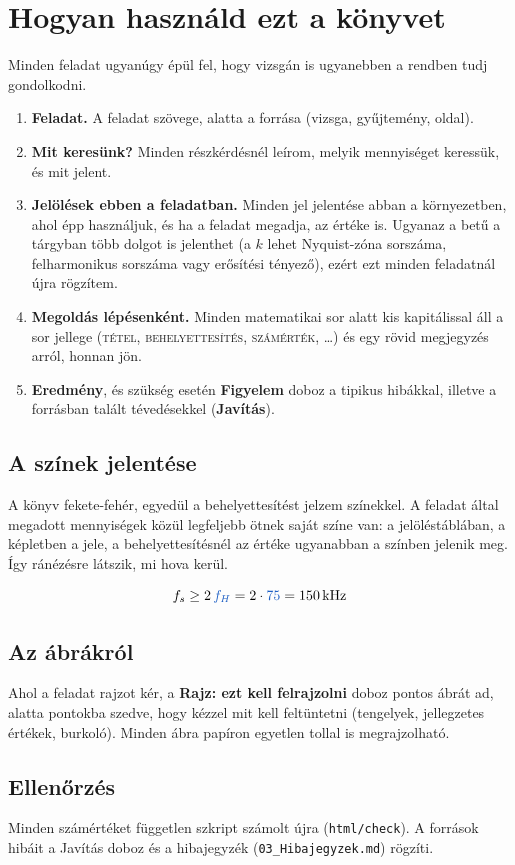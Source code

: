 \chapter*{Hogyan használd ezt a könyvet}
Minden feladat ugyanúgy épül fel, hogy vizsgán is ugyanebben a rendben tudj gondolkodni.
\begin{enumerate}
\item \textbf{Feladat.} A feladat szövege, alatta a forrása (vizsga, gyűjtemény, oldal).
\item \textbf{Mit keresünk?} Minden részkérdésnél leírom, melyik mennyiséget keressük, és mit jelent.
\item \textbf{Jelölések ebben a feladatban.} Minden jel jelentése abban a környezetben, ahol épp használjuk, és ha a feladat megadja, az értéke is. Ugyanaz a betű a tárgyban több dolgot is jelenthet (a $k$ lehet Nyquist-zóna sorszáma, felharmonikus sorszáma vagy erősítési tényező), ezért ezt minden feladatnál újra rögzítem.
\item \textbf{Megoldás lépésenként.} Minden matematikai sor alatt kis kapitálissal áll a sor jellege (\textsc{tétel}, \textsc{behelyettesítés}, \textsc{számérték}, \ldots) és egy rövid megjegyzés arról, honnan jön.
\item \textbf{Eredmény}, és szükség esetén \textbf{Figyelem} doboz a tipikus hibákkal, illetve a forrásban talált tévedésekkel (\textbf{Javítás}).
\end{enumerate}

\section*{A színek jelentése}
A könyv fekete-fehér, egyedül a behelyettesítést jelzem színekkel. A feladat által megadott mennyiségek közül legfeljebb ötnek saját színe van: a jelöléstáblában, a képletben a jele, a behelyettesítésnél az értéke ugyanabban a színben jelenik meg. Így ránézésre látszik, mi hova kerül.
\begin{center}
\quad {}\quad {}\quad {}\quad {}
\end{center}
\[
f_s\ge2\,\ca{f_H}=2\cdot\ca{75}=150\un{kHz}
\]

\section*{Az ábrákról}
Ahol a feladat rajzot kér, a \textbf{Rajz: ezt kell felrajzolni} doboz pontos ábrát ad, alatta pontokba szedve, hogy kézzel mit kell feltüntetni (tengelyek, jellegzetes értékek, burkoló). Minden ábra papíron egyetlen tollal is megrajzolható.

\section*{Ellenőrzés}
Minden számértéket független szkript számolt újra (\texttt{html/check}). A források hibáit a Javítás doboz és a hibajegyzék (\texttt{03\_Hibajegyzek.md}) rögzíti.
